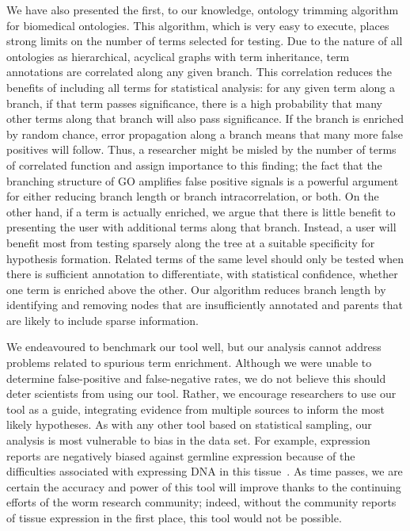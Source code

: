 \documentclass{bmcart}
\begin{document}
We have also presented the first, to our knowledge, ontology trimming algorithm for biomedical ontologies. This algorithm, which is very easy to execute, places strong limits on the number of terms selected for testing. Due to the nature of all ontologies as hierarchical, acyclical graphs with term inheritance, term annotations are correlated along any given branch. This correlation reduces the benefits of including all terms for statistical analysis: for any given term along a branch, if that term passes significance, there is a high probability that many other terms along that branch will also pass significance. If the branch is enriched by random chance, error propagation along a branch means that many more false positives will follow. Thus, a researcher might be misled by the number of terms of correlated function and assign importance to this finding; the fact that the branching structure of GO amplifies false positive signals is a powerful argument for either reducing branch length or branch intracorrelation, or both. On the other hand, if a term is actually enriched, we argue that there is little benefit to presenting the user with additional terms along that branch. Instead, a user will benefit most from testing sparsely along the tree at a suitable specificity for hypothesis formation. Related terms of the same level should only be tested when there is sufficient annotation to differentiate, with statistical confidence, whether one term is enriched above the other. Our algorithm reduces branch length by identifying and removing nodes that are insufficiently annotated and parents that are likely to include sparse information.


We endeavoured to benchmark our tool well, but our analysis cannot address problems related to %
 spurious term enrichment.
 Although we were unable to determine false-positive and false-negative rates, we do not believe this should deter scientists from using our tool. Rather, we encourage researchers to use our tool as a guide, integrating evidence from multiple sources to inform the most likely hypotheses. As with any other tool based on statistical sampling, our analysis is most vulnerable to bias in the data set. For example, expression reports are negatively biased against germline expression because of the difficulties associated with expressing DNA in this tissue~\cite{Kelly1997}. As time passes, we are certain the accuracy and power of this tool will improve thanks to the continuing efforts of the  worm research community; indeed, without the community reports of tissue expression in the first place, this tool would not be possible.
\end{document}
